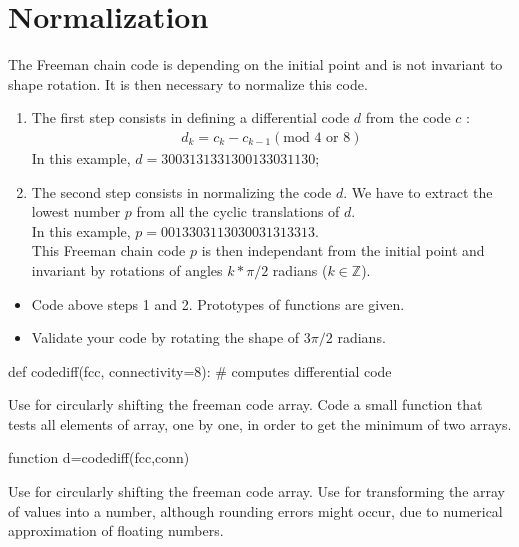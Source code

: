 \section{Normalization}
The Freeman chain code is depending on the initial point and is not invariant to shape rotation. It is then necessary to normalize this code.
\begin{enumerate}
	\item The first step consists in defining a differential code $d$ from the code $c$ :
	\begin{eqnarray*}
		d_k=c_k-c_{k-1} (\text{mod 4 or 8})
	\end{eqnarray*}
	In this example, $d=3003131331300133031130$;
	\item The second step consists in normalizing the code $d$. We have to extract the lowest number $p$ from all the cyclic translations of $d$.\\
	In this example, $p=0013303113030031313313$.\\
	 This Freeman chain code $p$ is then independant from the initial point and invariant by rotations of angles $k*\pi/2$ radians ($k\in \mathbb{Z}$).
	 
\end{enumerate}
\begin{qbox}
 \begin{itemize}
  \item Code above steps 1 and 2. Prototypes of functions are given.
  \item Validate your code by rotating the shape of $3\pi/2$ radians.
 \end{itemize}

\end{qbox}

	\begin{pcomment}
\begin{python}
def codediff(fcc, connectivity=8):
# computes differential code
\end{python}


\begin{premark}
 Use  for circularly shifting the freeman code array. Code a small function that tests all elements of array, one by one, in order to get the minimum of two arrays.
\end{premark}

	\end{pcomment}
	
	\begin{mcomment}
\begin{matlab}
function d=codediff(fcc,conn)
\end{matlab}

\begin{mremark}
 Use  for circularly shifting the freeman code array.
 Use  for transforming the array of values into a number, although rounding errors might occur, due to numerical approximation of floating numbers.
\end{mremark}
\end{mcomment}



